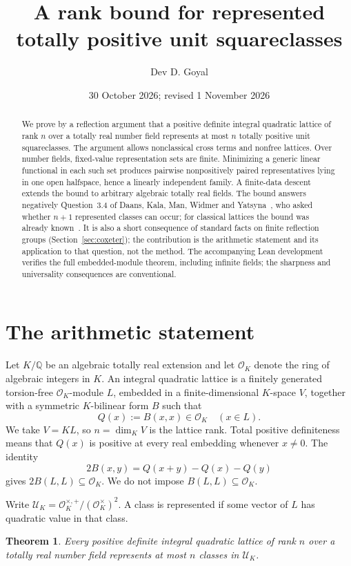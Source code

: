 \documentclass[11pt]{article}
\title{A rank bound for represented\protect\\totally positive unit squareclasses}
\author{Dev D. Goyal}
\date{30 October 2026; revised 1 November 2026}
\newtheorem{theorem}{Theorem}
\newcommand{\OK}{\mathcal O_K}
\newcommand{\Q}{\mathbb Q}
\newcommand{\U}{\mathcal U}
\begin{document}
\maketitle

\begin{abstract}
We prove by a reflection argument that a positive definite integral quadratic lattice of rank $n$ over a totally real number field represents at most $n$ totally positive unit squareclasses. The argument allows nonclassical cross terms and nonfree lattices. Over number fields, fixed-value representation sets are finite. Minimizing a generic linear functional in each such set produces pairwise nonpositively paired representatives lying in one open halfspace, hence a linearly independent family. A finite-data descent extends the bound to arbitrary algebraic totally real fields. The bound answers negatively Question~3.4 of Daans, Kala, Man, Widmer and Yatsyna~\cite{DKMWY}, who asked whether $n+1$ represented classes can occur; for classical lattices the bound was already known~\cite{DKM}. It is also a short consequence of standard facts on finite reflection groups (Section~\ref{sec:coxeter}); the contribution is the arithmetic statement and its application to that question, not the method. The accompanying Lean development verifies the full embedded-module theorem, including infinite fields; the sharpness and universality consequences are conventional.
\end{abstract}

\section{The arithmetic statement}
Let $K/\Q$ be an algebraic totally real extension and let $\OK$ denote the ring of algebraic integers in $K$. An integral quadratic lattice is a finitely generated torsion-free $\OK$-module $L$, embedded in a finite-dimensional $K$-space $V$, together with a symmetric $K$-bilinear form $B$ such that
\[
 Q(x):=B(x,x)\in\OK \quad (x\in L).
\]
We take $V=K L$, so $n=\dim_K V$ is the lattice rank. Total positive definiteness means that $Q(x)$ is positive at every real embedding whenever $x\ne0$. The identity
\[
 2B(x,y)=Q(x+y)-Q(x)-Q(y)
\]
gives $2B(L,L)\subseteq\OK$. We do not impose $B(L,L)\subseteq\OK$.

Write $\U_K=\OK^{\times,+}/(\OK^\times)^2$. A class is represented if some vector of $L$ has quadratic value in that class.

\begin{theorem}\label{thm:main}
Every positive definite integral quadratic lattice of rank $n$ over a totally real number field represents at most $n$ classes in $\U_K$.
\end{theorem}
\end{document}
